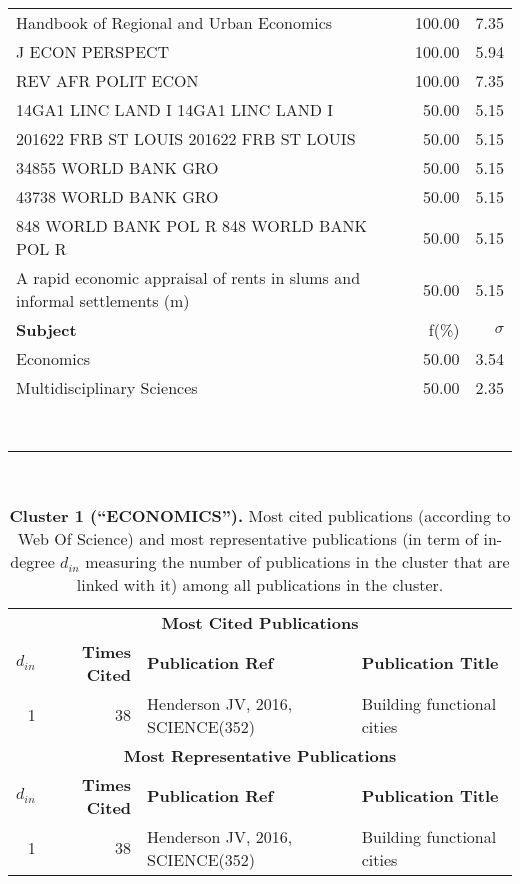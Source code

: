 \documentclass[a4paper,11pt]{report}
\begin{document}
\begin{landscape}
\begin{table}[!ht]
{\begin{tabular}{|p{8cm} r r|}
Handbook of Regional and Urban Economics & 100.00 & 7.35\\
J ECON PERSPECT & 100.00 & 5.94\\
REV AFR POLIT ECON & 100.00 & 7.35\\
14GA1 LINC LAND I 14GA1 LINC LAND I & 50.00 & 5.15\\
201622 FRB ST LOUIS 201622 FRB ST LOUIS & 50.00 & 5.15\\
34855 WORLD BANK GRO & 50.00 & 5.15\\
43738 WORLD BANK GRO & 50.00 & 5.15\\
848 WORLD BANK POL R 848 WORLD BANK POL R & 50.00 & 5.15\\
A rapid economic appraisal of rents in slums and informal settlements (m) & 50.00 & 5.15\\
\hline
{\bf Subject }& f(\%) & $\sigma$\\
\hline
Economics & 50.00 & 3.54\\
Multidisciplinary Sciences & 50.00 & 2.35\\
 &  & \\
 &  & \\
 &  & \\
 &  & \\
 &  & \\
 &  & \\
 &  & \\
 &  & \\
\hline
\end{tabular}
}
\end{table}

\clearpage

\begin{table}[!ht]
\caption*{{\bf Cluster 1 (``ECONOMICS'').} Most cited publications (according to Web Of Science) and most representative publications (in term of in-degree $d_{in}$ measuring the number of publications in the cluster that are linked with it) among all publications in the cluster.}
\textcolor{white}{aa}\\
{\scriptsize\begin{tabular}{|r r p{7cm} p{17cm}|}
\hline
\multicolumn{4}{|c|}{{\bf Most Cited Publications}}\\
{\bf $d_{in}$} & {\bf Times Cited} & {\bf Publication Ref} & {\bf Publication Title} \\
1 & 38 & Henderson JV, 2016, SCIENCE(352) & Building functional cities\\
\hline
\hline
\multicolumn{4}{|c|}{{\bf Most Representative Publications}}\\
{\bf $d_{in}$} & {\bf Times Cited} & {\bf Publication Ref} & {\bf Publication Title} \\
1 & 38 & Henderson JV, 2016, SCIENCE(352) & Building functional cities\\
\hline
\end{tabular}
}
\end{table}


\end{landscape}
\end{document}
